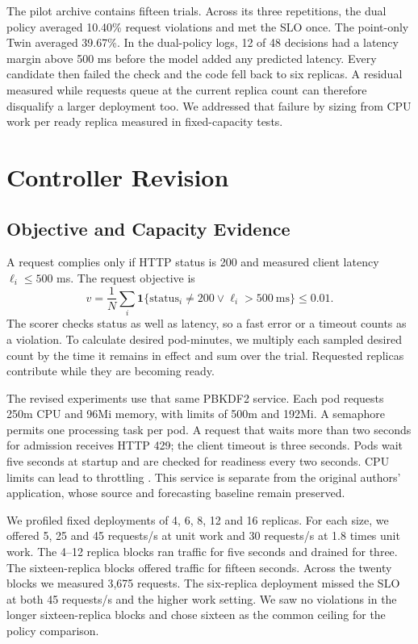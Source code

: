 \documentclass[10pt,twocolumn,a4paper]{article}
\begin{document}
The pilot archive contains fifteen trials. Across its three repetitions, the dual policy averaged 10.40\% request violations and met the SLO once. The point-only Twin averaged 39.67\%. In the dual-policy logs, 12 of 48 decisions had a latency margin above 500 ms before the model added any predicted latency. Every candidate then failed the check and the code fell back to six replicas. A residual measured while requests queue at the current replica count can therefore disqualify a larger deployment too. We addressed that failure by sizing from CPU work per ready replica measured in fixed-capacity tests.

\section{Controller Revision}
\subsection{Objective and Capacity Evidence}
A request complies only if HTTP status is 200 and measured client latency $\ell_i\leq500$ ms. The request objective is
\begin{equation}v=\frac{1}{N}\sum_i\mathbf1\{\mathrm{status}_i\ne200\lor\ell_i>500\mathrm{\ ms}\}\leq0.01.\label{eq:slo}\end{equation}
The scorer checks status as well as latency, so a fast error or a timeout counts as a violation. To calculate desired pod-minutes, we multiply each sampled desired count by the time it remains in effect and sum over the trial. Requested replicas contribute while they are becoming ready.

The revised experiments use that same PBKDF2 service. Each pod requests 250m CPU and 96Mi memory, with limits of 500m and 192Mi. A semaphore permits one processing task per pod. A request that waits more than two seconds for admission receives HTTP 429; the client timeout is three seconds. Pods wait five seconds at startup and are checked for readiness every two seconds. CPU limits can lead to throttling \cite{j01,j12}. This service is separate from the original authors' application, whose source and forecasting baseline remain preserved.

We profiled fixed deployments of 4, 6, 8, 12 and 16 replicas. For each size, we offered 5, 25 and 45 requests/s at unit work and 30 requests/s at 1.8 times unit work. The 4--12 replica blocks ran traffic for five seconds and drained for three. The sixteen-replica blocks offered traffic for fifteen seconds. Across the twenty blocks we measured 3,675 requests. The six-replica deployment missed the SLO at both 45 requests/s and the higher work setting. We saw no violations in the longer sixteen-replica blocks and chose sixteen as the common ceiling for the policy comparison.
\end{document}
